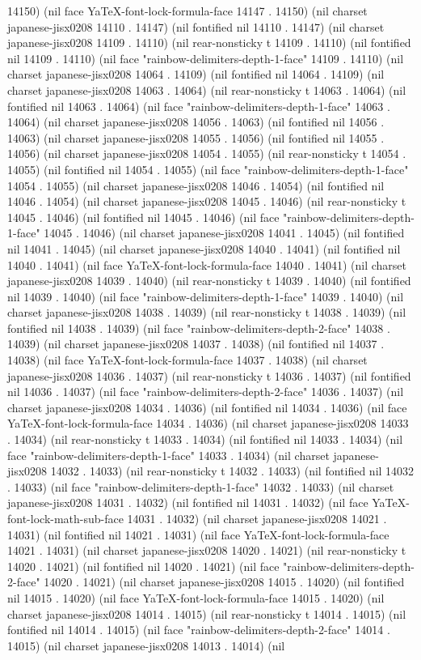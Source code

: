 14150) (nil face YaTeX-font-lock-formula-face 14147 . 14150) (nil charset japanese-jisx0208 14110 . 14147) (nil fontified nil 14110 . 14147) (nil charset japanese-jisx0208 14109 . 14110) (nil rear-nonsticky t 14109 . 14110) (nil fontified nil 14109 . 14110) (nil face "rainbow-delimiters-depth-1-face" 14109 . 14110) (nil charset japanese-jisx0208 14064 . 14109) (nil fontified nil 14064 . 14109) (nil charset japanese-jisx0208 14063 . 14064) (nil rear-nonsticky t 14063 . 14064) (nil fontified nil 14063 . 14064) (nil face "rainbow-delimiters-depth-1-face" 14063 . 14064) (nil charset japanese-jisx0208 14056 . 14063) (nil fontified nil 14056 . 14063) (nil charset japanese-jisx0208 14055 . 14056) (nil fontified nil 14055 . 14056) (nil charset japanese-jisx0208 14054 . 14055) (nil rear-nonsticky t 14054 . 14055) (nil fontified nil 14054 . 14055) (nil face "rainbow-delimiters-depth-1-face" 14054 . 14055) (nil charset japanese-jisx0208 14046 . 14054) (nil fontified nil 14046 . 14054) (nil charset japanese-jisx0208 14045 . 14046) (nil rear-nonsticky t 14045 . 14046) (nil fontified nil 14045 . 14046) (nil face "rainbow-delimiters-depth-1-face" 14045 . 14046) (nil charset japanese-jisx0208 14041 . 14045) (nil fontified nil 14041 . 14045) (nil charset japanese-jisx0208 14040 . 14041) (nil fontified nil 14040 . 14041) (nil face YaTeX-font-lock-formula-face 14040 . 14041) (nil charset japanese-jisx0208 14039 . 14040) (nil rear-nonsticky t 14039 . 14040) (nil fontified nil 14039 . 14040) (nil face "rainbow-delimiters-depth-1-face" 14039 . 14040) (nil charset japanese-jisx0208 14038 . 14039) (nil rear-nonsticky t 14038 . 14039) (nil fontified nil 14038 . 14039) (nil face "rainbow-delimiters-depth-2-face" 14038 . 14039) (nil charset japanese-jisx0208 14037 . 14038) (nil fontified nil 14037 . 14038) (nil face YaTeX-font-lock-formula-face 14037 . 14038) (nil charset japanese-jisx0208 14036 . 14037) (nil rear-nonsticky t 14036 . 14037) (nil fontified nil 14036 . 14037) (nil face "rainbow-delimiters-depth-2-face" 14036 . 14037) (nil charset japanese-jisx0208 14034 . 14036) (nil fontified nil 14034 . 14036) (nil face YaTeX-font-lock-formula-face 14034 . 14036) (nil charset japanese-jisx0208 14033 . 14034) (nil rear-nonsticky t 14033 . 14034) (nil fontified nil 14033 . 14034) (nil face "rainbow-delimiters-depth-1-face" 14033 . 14034) (nil charset japanese-jisx0208 14032 . 14033) (nil rear-nonsticky t 14032 . 14033) (nil fontified nil 14032 . 14033) (nil face "rainbow-delimiters-depth-1-face" 14032 . 14033) (nil charset japanese-jisx0208 14031 . 14032) (nil fontified nil 14031 . 14032) (nil face YaTeX-font-lock-math-sub-face 14031 . 14032) (nil charset japanese-jisx0208 14021 . 14031) (nil fontified nil 14021 . 14031) (nil face YaTeX-font-lock-formula-face 14021 . 14031) (nil charset japanese-jisx0208 14020 . 14021) (nil rear-nonsticky t 14020 . 14021) (nil fontified nil 14020 . 14021) (nil face "rainbow-delimiters-depth-2-face" 14020 . 14021) (nil charset japanese-jisx0208 14015 . 14020) (nil fontified nil 14015 . 14020) (nil face YaTeX-font-lock-formula-face 14015 . 14020) (nil charset japanese-jisx0208 14014 . 14015) (nil rear-nonsticky t 14014 . 14015) (nil fontified nil 14014 . 14015) (nil face "rainbow-delimiters-depth-2-face" 14014 . 14015) (nil charset japanese-jisx0208 14013 . 14014) (nil 